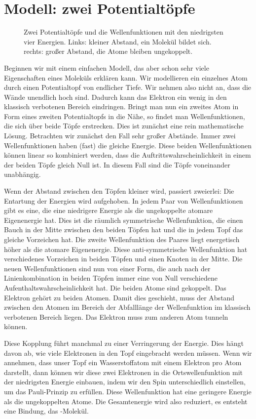 \section{Modell: zwei Potentialtöpfe}
\begin{figure}
  \caption{Zwei Potentialtöpfe und die Wellenfunktionen mit den niedrigsten vier Energien. Links: kleiner Abstand, ein Molekül bildet sich. rechts: großer Abstand, die Atome bleiben ungekoppelt.}
\end{figure}

Beginnen wir mit einem einfachen Modell, das aber schon sehr viele Eigenschaften eines Moleküls erklären kann. Wir modellieren ein einzelnes Atom durch einen Potentialtopf von endlicher Tiefe. Wir nehmen also nicht an, dass die Wände unendlich hoch sind. Dadurch kann das Elektron ein wenig in den klassisch verbotenen Bereich eindringen. Bringt man nun ein zweites Atom in Form eines zweiten Potentialtopfs in die Nähe, so findet man Wellenfunktionen, die sich über beide Töpfe erstrecken. Dies ist zunächst eine rein mathematische Lösung. Betrachten wir zunächst den Fall sehr großer Abstände. Immer zwei Wellenfunktionen haben (fast) die gleiche Energie. Diese beiden Wellenfunktionen können linear so kombiniert werden, dass die Auftrittswahrscheinlichkeit in einem der beiden Töpfe gleich Null ist. In diesem Fall sind die Töpfe voneinander unabhängig.

Wenn der Abstand zwischen den Töpfen kleiner wird, passiert zweierlei: Die Entartung der Energien wird aufgehoben. In jedem Paar von Wellenfunktionen gibt es eine, die eine niedrigere Energie als die ungekoppelte atomare Eigenenergie hat. Dies ist die räumlich symmetrische Wellenfunktion, die einen Bauch in der Mitte zwischen den beiden Töpfen hat und die in jedem Topf das gleiche Vorzeichen hat. Die zweite Wellenfunktion des Paares liegt energetisch höher als die atomare Eigenenergie.  Diese anti-symmetrische  Wellenfunktion hat verschiedenes Vorzeichen in beiden Töpfen und einen Knoten in der Mitte. Die neuen Wellenfunktionen sind nun von einer Form, die auch nach der Linienkombination in beiden Töpfen immer eine von Null verschiedene Aufenthaltswahrscheinlichkeit hat. Die beiden Atome sind gekoppelt. Das Elektron gehört zu beiden Atomen. Damit dies geschieht, muss der Abstand zwischen den Atomen im Bereich der Abfalllänge der Wellenfunktion im klassisch verbotenen Bereich liegen. Das Elektron muss zum anderen Atom tunneln können.

Diese Kopplung führt manchmal zu einer Verringerung der Energie. Dies hängt davon ab, wie viele Elektronen in den Topf eingebracht werden müssen. Wenn wir annehmen, dass unser Topf ein Wasserstoffatom mit einem Elektron pro Atom darstellt, dann können wir diese zwei Elektronen in die Ortswellenfunktion mit der niedrigsten Energie einbauen, indem wir den Spin unterschiedlich einstellen, um das Pauli-Prinzip zu erfüllen. Diese Wellenfunktion hat eine geringere Energie als die ungekoppelten Atome. Die Gesamtenergie wird also reduziert, es entsteht eine Bindung, das -Molekül.

